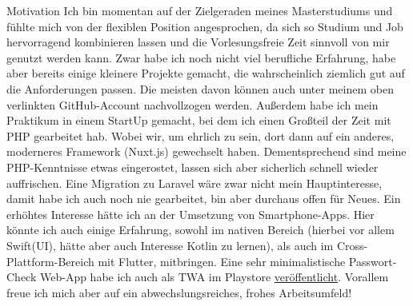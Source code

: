 \begin{cventries}
\cventry
    {} %
    {Motivation} %
    {} %
    {} %
    {
      Ich bin momentan auf der Zielgeraden meines Masterstudiums und fühlte mich von der flexiblen Position angesprochen, da sich so Studium und Job hervorragend kombinieren lassen und die Vorlesungsfreie Zeit sinnvoll von mir genutzt werden kann.\newline
      Zwar habe ich noch nicht viel berufliche Erfahrung, habe aber bereits einige kleinere Projekte gemacht, die wahrscheinlich ziemlich gut auf die Anforderungen passen. 
      Die meisten davon können auch unter meinem oben verlinkten GitHub-Account nachvollzogen werden.
      Außerdem habe ich mein Praktikum in einem StartUp gemacht, bei dem ich einen Großteil der Zeit mit PHP gearbeitet hab. Wobei wir, um ehrlich zu sein, dort dann auf ein anderes, moderneres Framework (Nuxt.js) gewechselt haben. Dementsprechend sind meine PHP-Kenntnisse etwas eingerostet, lassen sich aber sicherlich schnell wieder auffrischen. \newline
      Eine Migration zu Laravel wäre zwar nicht mein Hauptinteresse, damit habe ich auch noch nie gearbeitet, bin aber durchaus offen für Neues.\newline
      Ein erhöhtes Interesse hätte ich an der Umsetzung von Smartphone-Apps. Hier könnte ich auch einige Erfahrung, sowohl im nativen Bereich (hierbei vor allem Swift(UI), hätte aber auch Interesse Kotlin zu lernen), als auch im Cross-Plattform-Bereich mit Flutter, mitbringen. Eine sehr minimalistische Passwort-Check Web-App habe ich auch als TWA im Playstore \href{https://play.google.com/store/apps/details?id=hannepps.tools.passwordchecker}{veröffentlicht}. \newline
      Vorallem freue ich mich aber auf ein abwechslungsreiches, frohes Arbeitsumfeld!
    }
\end{cventries}
